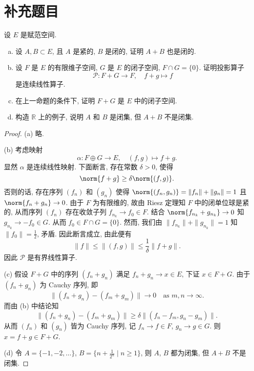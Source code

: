 \chapter*{补充题目}


\begin{exercise}[1]
  设 $E$ 是赋范空间.
  \begin{enumerate}[(a)]
    \item 设 $A, B\subset E$, 且 $A$ 是紧的, $B$ 是闭的, 证明 $A+B$ 也是闭的.
    \item 设 $F$ 是 $E$ 的有限维子空间, $G$ 是 $E$ 的闭子空间, $F\cap G=\{0\}$.
      证明投影算子
      \[\mathcal{P}\colon F+G \to F,\quad f+g\mapsto f\]
      是连续线性算子.
    \item 在上一命题的条件下, 证明 $F+G$ 是 $E$ 中的闭子空间.
    \item 构造 $\mathbb{R}$ 上的例子, 说明 $A$ 和 $B$ 是闭集, 但 $A+B$ 不是闭集.
  \end{enumerate}
\end{exercise}

\begin{proof}
  (a) 略.

  (b) 考虑映射
  \[\alpha\colon F\oplus G \to E,\quad (f,g) \mapsto f+g.\]
  显然 $\alpha$ 是连续线性映射. 下面断言, 存在常数 $\delta>0$, 使得
  \[\norm{f+g} \geq \delta\norm{(f,g)}.\]
  否则的话, 存在序列 $(f_n)$ 和 $(g_n)$ 使得 $\norm{(f_n, g_n)} = \|f_n\|+\|g_n\| = 1$ 且
  $\norm{f_n+g_n}\to 0$.
  由于 $F$ 为有限维的, 故由 Riesz 定理知 $F$ 中的闭单位球是紧的, 从而序列
  $(f_n)$ 存在收敛子列 $f_{n_k}\to f_0\in F$.
  结合 $\norm{f_{n_k}+g_{n_k}}\to 0$ 知 $g_{n_k}\to -f_0\in G$.
  从而 $f_0\in F\cap G=\{0\}$. 然而, 我们由 $\|f_{n_k}\|+\|g_{n_k}\| = 1$
  知 $\|f_0\|=\frac{1}{2}$, 矛盾. 因此断言成立, 由此便有
  \[\|f\| \leq \|(f,g)\| \leq \frac{1}{\delta}\|f+g\|.\]
  因此 $\mathcal{P}$ 是有界线性算子.

  (c) 假设 $F+G$ 中的序列 $(f_n+g_n)$ 满足 $f_n+g_n\to x\in E$, 下证 $x\in F+G$.
  由于 $(f_n+g_n)$ 为 Cauchy 序列, 即
  \[\|(f_n+g_n) - (f_m+g_m)\| \to 0\quad\text{as } m,n\to\infty.\]
  而由 (b) 中结论知
  \[\|(f_n+g_n) - (f_m+g_m)\| \geq \delta \|(f_n-f_m, g_n-g_m)\|.\]
  从而 $(f_n)$ 和 $(g_n)$ 皆为 Cauchy 序列, 记 $f_n\to f\in F$, $g_n\to g\in G$.
  则 $x = f+g \in F+G$.

  (d) 令 $A=\{-1,-2,\ldots\}$, $B=\{n+\frac{1}{2^n}\mid n\geq 1\}$,
  则 $A$, $B$ 都为闭集, 但 $A+B$ 不是闭集.
\end{proof}


